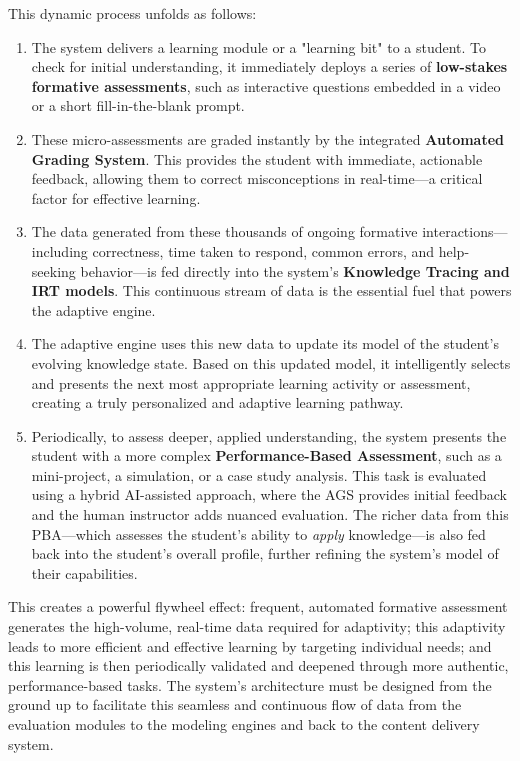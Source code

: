\documentclass{article}
\begin{document}
This dynamic process unfolds as follows:
\begin{enumerate}
    \item The system delivers a learning module or a "learning bit" to a student. To check for initial understanding, it immediately deploys a series of \textbf{low-stakes formative assessments}, such as interactive questions embedded in a video or a short fill-in-the-blank prompt.\cite{90, 92}
    \item These micro-assessments are graded instantly by the integrated \textbf{Automated Grading System}. This provides the student with immediate, actionable feedback, allowing them to correct misconceptions in real-time—a critical factor for effective learning.\cite{103, 104}
    \item The data generated from these thousands of ongoing formative interactions—including correctness, time taken to respond, common errors, and help-seeking behavior—is fed directly into the system's \textbf{Knowledge Tracing and IRT models}. This continuous stream of data is the essential fuel that powers the adaptive engine.
    \item The adaptive engine uses this new data to update its model of the student's evolving knowledge state. Based on this updated model, it intelligently selects and presents the next most appropriate learning activity or assessment, creating a truly personalized and adaptive learning pathway.\cite{34, 36}
    \item Periodically, to assess deeper, applied understanding, the system presents the student with a more complex \textbf{Performance-Based Assessment}, such as a mini-project, a simulation, or a case study analysis. This task is evaluated using a hybrid AI-assisted approach, where the AGS provides initial feedback and the human instructor adds nuanced evaluation.\cite{96, 97} The richer data from this PBA—which assesses the student's ability to \textit{apply} knowledge—is also fed back into the student's overall profile, further refining the system's model of their capabilities.
\end{enumerate}

This creates a powerful flywheel effect: frequent, automated formative assessment generates the high-volume, real-time data required for adaptivity; this adaptivity leads to more efficient and effective learning by targeting individual needs; and this learning is then periodically validated and deepened through more authentic, performance-based tasks. The system's architecture must be designed from the ground up to facilitate this seamless and continuous flow of data from the evaluation modules to the modeling engines and back to the content delivery system.
\end{document}
